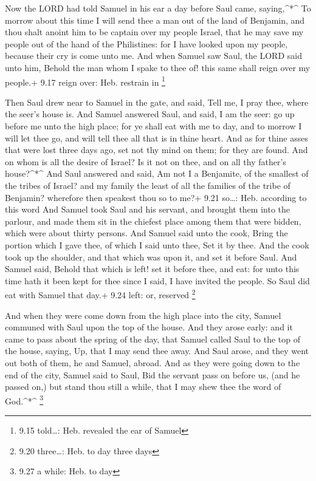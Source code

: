  Now the LORD had told Samuel in his ear a day before Saul
came, saying,\^{}*\^{}  To morrow about this time I will
send thee a man out of the land of Benjamin, and thou shalt anoint him
to be captain over my people Israel, that he may save my people out of
the hand of the Philistines: for I have looked upon my people, because
their cry is come unto me.  And when Samuel saw Saul, the
LORD said unto him, Behold the man whom I spake to thee of! this same
shall reign over my people.+ 9.17 reign over: Heb. restrain in
\footnote{9.15 told\ldots: Heb. revealed the ear of Samuel}

 Then Saul drew near to Samuel in the gate, and said, Tell
me, I pray thee, where the seer's house is.  And Samuel
answered Saul, and said, I am the seer: go up before me unto the high
place; for ye shall eat with me to day, and to morrow I will let thee
go, and will tell thee all that is in thine heart.  And as
for thine asses that were lost three days ago, set not thy mind on them;
for they are found. And on whom is all the desire of Israel? Is it not
on thee, and on all thy father's house?\^{}*\^{}  And Saul
answered and said, Am not I a Benjamite, of the smallest of the tribes
of Israel? and my family the least of all the families of the tribe of
Benjamin? wherefore then speakest thou so to me?+ 9.21 so\ldots: Heb.
according to this word  And Samuel took Saul and his
servant, and brought them into the parlour, and made them sit in the
chiefest place among them that were bidden, which were about thirty
persons.  And Samuel said unto the cook, Bring the portion
which I gave thee, of which I said unto thee, Set it by thee.
 And the cook took up the shoulder, and that which was upon
it, and set it before Saul. And Samuel said, Behold that which is left!
set it before thee, and eat: for unto this time hath it been kept for
thee since I said, I have invited the people. So Saul did eat with
Samuel that day.+ 9.24 left: or, reserved \footnote{9.20 three\ldots:
  Heb. to day three days}

 And when they were come down from the high place into the
city, Samuel communed with Saul upon the top of the house. 
And they arose early: and it came to pass about the spring of the day,
that Samuel called Saul to the top of the house, saying, Up, that I may
send thee away. And Saul arose, and they went out both of them, he and
Samuel, abroad.  And as they were going down to the end of
the city, Samuel said to Saul, Bid the servant pass on before us, (and
he passed on,) but stand thou still a while, that I may shew thee the
word of God.\^{}*\^{} \footnote{9.27 a while: Heb. to day}


